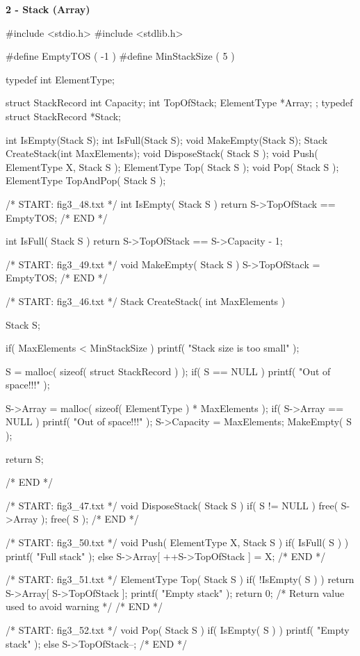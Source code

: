 \documentclass[12pt, a4paper]{article}
\begin{document}
\Huge\textbf{2 - Stack (Array)}
\begin{code}
#include <stdio.h>
#include <stdlib.h>

#define EmptyTOS ( -1 )
#define MinStackSize ( 5 )

typedef int ElementType;

struct StackRecord
{
    int Capacity;
    int TopOfStack;
    ElementType *Array;
};
typedef struct StackRecord *Stack;

int IsEmpty(Stack S);
int IsFull(Stack S);
void MakeEmpty(Stack S);
Stack CreateStack(int MaxElements);
void DisposeStack( Stack S );
void Push( ElementType X, Stack S );
ElementType Top( Stack S );
void Pop( Stack S );
ElementType TopAndPop( Stack S );

/* START: fig3_48.txt */
int IsEmpty( Stack S )
{
    return S->TopOfStack == EmptyTOS;
}
/* END */

int IsFull( Stack S )
{
    return S->TopOfStack == S->Capacity - 1;
}

/* START: fig3_49.txt */
void MakeEmpty( Stack S )
{
    S->TopOfStack = EmptyTOS;
}
/* END */

/* START: fig3_46.txt */
Stack CreateStack( int MaxElements )
{
    Stack S;

    if( MaxElements < MinStackSize )
        printf( "Stack size is too small" );

    S = malloc( sizeof( struct StackRecord ) );
    if( S == NULL )
        printf( "Out of space!!!" );

    S->Array = malloc( sizeof( ElementType ) * MaxElements );
    if( S->Array == NULL )
        printf( "Out of space!!!" );
    S->Capacity = MaxElements;
    MakeEmpty( S );

    return S;
}
/* END */



/* START: fig3_47.txt */
void DisposeStack( Stack S )
{
    if( S != NULL )
    {
        free( S->Array );
        free( S );
    }
}
/* END */

/* START: fig3_50.txt */
void Push( ElementType X, Stack S )
{
    if( IsFull( S ) )
        printf( "Full stack" );
    else
        S->Array[ ++S->TopOfStack ] = X;
}
/* END */


/* START: fig3_51.txt */
ElementType Top( Stack S )
{
    if( !IsEmpty( S ) )
        return S->Array[ S->TopOfStack ];
    printf( "Empty stack" );
    return 0;  /* Return value used to avoid warning */
}
/* END */

/* START: fig3_52.txt */
void Pop( Stack S )
{
    if( IsEmpty( S ) )
        printf( "Empty stack" );
    else
        S->TopOfStack--;
}
/* END */


\end{code}
\end{document}
